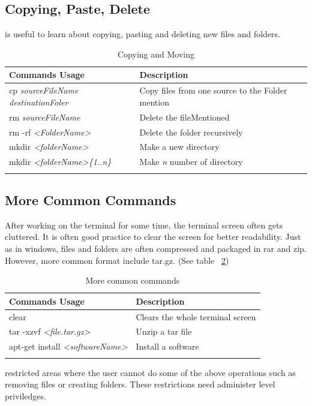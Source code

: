 \documentclass{tufte-book} %
\begin{document}
\subsection[Copy, Paste, Delete]{Copying, Paste, Delete}

 is useful to learn about copying, pasting and deleting new files and folders.

\begin{table}
  \begin{tabular}{ll}
    \toprule
    Commands Usage & Description \\
    \midrule
    cp \textit{sourceFileName destinationFoler} & Copy files from one source to the Folder mention \\
    rm \textit{sourceFileName} & Delete the fileMentioned \\
    rm -rf \textit{<FolderName>} & Delete the folder recursively \\
    mkdir \textit{<folderName>} & Make a new directory \\
    mkdir \textit{<folderName>\{1..n\}} & Make \textit{n} number of directory \\
    
    \bottomrule
  \caption{Copying and Moving}
  \end{tabular}
  \label{command1}
\end{table}

\subsection[common commands]{More Common Commands}

\begin{fullwidth}
  After working on the terminal for some time, the terminal screen often gets cluttered. It is often good practice to clear the screen for better readability. Just as in windows, files and folders are often compressed and packaged in rar and zip. However, more common format include tar.gz. (See table ~\ref{command2})
  \end{fullwidth}

\begin{table}
  \begin{tabular}{ll}
    \toprule
    Commands Usage & Description \\
    \midrule
    clear & Clears the whole terminal screen \\
    tar -xzvf\textit{ <file.tar.gz>} & Unzip a tar file \\
    apt-get install \textit{<softwareName>} & Install a software \\
    
    \bottomrule
  \caption{More common commands}
  \end{tabular}
  \label{command2}
\end{table}
 restricted areas where the user cannot do some of the above operations such as removing files or creating folders. These restrictions need administer level priviledges.
\end{document}
